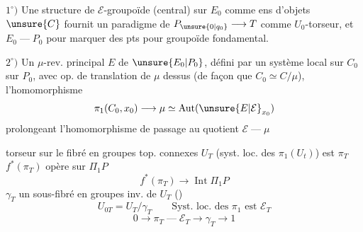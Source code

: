 $1^\circ)$ Une structure de $\mathcal E$-groupoïde (central)
sur $E_0$ comme ens d'objets
 $\unsure{C}$ fournit un paradigme de
$P_{\unsure{0|q_0}}\longrightarrow T$ comme $U_0$-torseur,
et $E_0\mathbin{\text{---}}P_0$ pour marquer des
pts pour groupoïde fondamental.

$2^\circ)$ Un \deleted{$\mu\longrightarrow$} $\mu$-rev. principal
 $E$
de $\unsure{E_0|P_0}$, défini par un système
local sur $C_0$ sur $P_0$, avec op. de
translation de $\mu$ dessus (de façon
que $C_0\simeq C/\mu$), l'homomorphisme
\[
\pi_1(C_0,x_0)\longrightarrow\mu\simeq\operatorname{Aut}(\unsure{E|\mathcal E}_{x_0})
\]
prolongeant
l'homomorphisme de passage
au quotient $\mathcal E\mathbin{\text{---}}\mu$

 torseur sur le fibré
en groupes
top. connexes $U_T$
(syst. loc. des $\pi_1(U_t)$) est $\pi_T$
$f^*(\pi_T)$  opère sur \deleted{\unsure{$\pi$}} $\Pi_1P$
\[
f^*(\pi_T)\longrightarrow\operatorname{Int}\Pi_1P
\]
$\gamma_T$ un sous-fibré en groupes inv. de $U_T$
()
\[
U_{0T}=U_T/\gamma_T
\qquad \text{Syst. loc. des }\pi_1\text{ est }\mathcal E_T
\]
\[
0\longrightarrow\pi_T\mathbin{\text{---}}\mathcal E_T
\longrightarrow\gamma_T\longrightarrow1
\]
